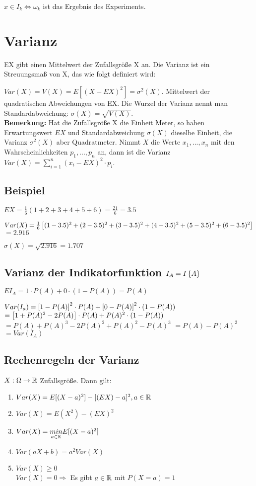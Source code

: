 $x \in I_k \Leftrightarrow \omega_k$ ist das Ergebnis des Experiments. 

\section{Varianz}
EX gibt einen Mittelwert der Zufallsgröße X an. Die Varianz ist ein Streuungsmaß von X, das wie folgt definiert wird: 

$Var(X) = V(X) = E[(X-EX)^2] = \sigma^2(X)$. Mittelwert der quadratischen Abweichungen von EX. Die Wurzel der Varianz nennt man Standardabweichung: $\sigma(X) = \sqrt{V(X)} $. \\

\textbf{Bemerkung:} Hat die Zufallsgröße X die Einheit Meter, so haben Erwartungswert $EX$ und Standardabweichung $\sigma (X)$ dieselbe Einheit, die Varianz $\sigma^2(X)$ aber Quadratmeter. 
Nimmt $X$ die Werte $x_1, ..., x_n$ mit den Wahrscheinlichkeiten $p_1, ..., p_n$ an, dann ist die Varianz 
$Var(X) = \sum_{i=1}^{n} (x_i - EX)^2 \cdot p_i$. 

\subsection{Beispiel}
$EX = \frac{1}{6} (1+2+3+4+5+6) = \frac{21}{6} = 3.5$

$Var(X) = \frac{1}{6}  \left[ (1-3.5)^2 + (2-3.5)^2 + (3-3.5)^2 + (4-3.5)^2 + (5-3.5)^2 + (6-3.5)^2 \right] $
$= 2.916$

$\sigma (X) = \sqrt{2.916} = 1.707$	

\subsection{Varianz der Indikatorfunktion $I_A = I \left\lbrace A \right\rbrace $}

$E I_A = 1 \cdot P(A) + 0\cdot (1-P(A)) = P(A)$

$Var(I_a) =  \left[ 1-P(A) \right] ^2 \cdot P(A) +  \left[ 0-P(A) \right] ^2 \cdot  \left( 1-P(A) \right) $
$=  \left[ 1 + P(A)^2 - 2 P(A) \right]  \cdot P(A) + P(A)^2 \cdot  \left( 1-P(A) \right) $
$=P(A) + P(A)^3 - 2 P(A)^2 + P(A)^2 - P(A)^3$
\underline{$=P(A) - P(A)^2$}
$=Var(I_A)$	

\subsection{Rechenregeln der Varianz}
\begin{satz}
$X: \Omega \rightarrow \mathbb{R}$ Zufallsgröße. Dann gilt: 
\begin{enumerate}
\item $Var(X) = E[(X-a)^2] - [(EX) - a]^2, a\in \mathbb{R}$
\item $Var(X) = E(X^2) - (EX)^2$
\item $Var(X) = \underset{a\in\mathbb{R}}{min} E[(X-a)^2]$
\item $Var(aX+b) = a^2 Var(X)$
\item $Var(X) \geq 0$\\
$Var(X) = 0 \Rightarrow $ Es gibt $a\in\mathbb{R}$ mit $P(X=a)=1$
\end{enumerate}
\end{satz}

